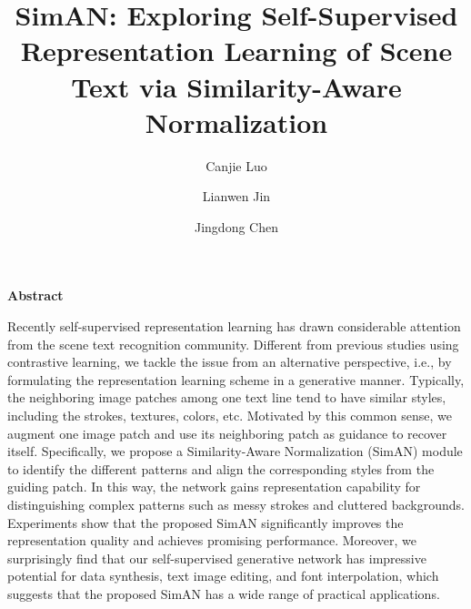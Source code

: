 \documentclass{article}
\title{\textbf{SimAN: Exploring Self-Supervised Representation Learning of Scene Text
via Similarity-Aware Normalization}}
\date{} %
\author[1]{Canjie Luo}\author[1,2,*]{Lianwen Jin}\author[3]{Jingdong Chen}
\affil[1]{South China University of Technology,}
\affil[2]{Peng Cheng Laboratory,}
\affil[3]{Ant Group}
\begin{document}
\maketitle
 

\begin{multicols}{2}

    \begin{center}
        \textbf{Abstract}
    \end{center}
    Recently self-supervised representation learning has
    drawn considerable attention from the scene text recognition community. Different from previous studies using contrastive learning, we tackle the issue from an alternative
    perspective, i.e., by formulating the representation learning
    scheme in a generative manner. Typically, the neighboring image patches among one text line tend to have similar styles, including the strokes, textures, colors, etc. Motivated by this common sense, we augment one image patch
    and use its neighboring patch as guidance to recover itself.
    Specifically, we propose a Similarity-Aware Normalization
    (SimAN) module to identify the different patterns and align
    the corresponding styles from the guiding patch. In this
    way, the network gains representation capability for distinguishing complex patterns such as messy strokes and cluttered backgrounds. Experiments show that the proposed
    SimAN significantly improves the representation quality and
    achieves promising performance. Moreover, we surprisingly find that our self-supervised generative network has
    impressive potential for data synthesis, text image editing,
    and font interpolation, which suggests that the proposed
    SimAN has a wide range of practical applications.

    

\end{multicols}
\end{document}
